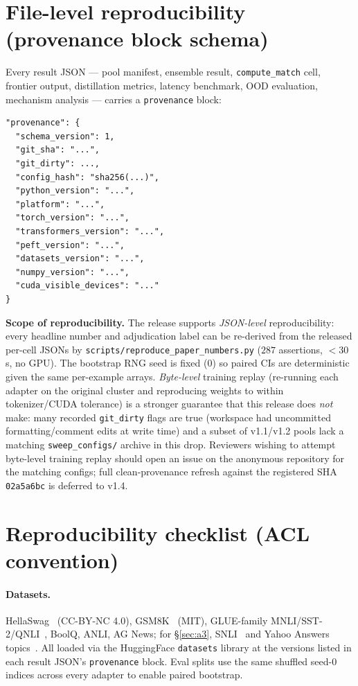 \documentclass[11pt]{article}
\begin{document}
\section{File-level reproducibility (provenance block schema)}\label{app:provenance}
Every result JSON --- pool manifest, ensemble result, \texttt{compute\_match} cell, frontier output, distillation metrics, latency benchmark, OOD evaluation, mechanism analysis --- carries a \texttt{provenance} block:
{\footnotesize
\begin{verbatim}
"provenance": {
  "schema_version": 1,
  "git_sha": "...",
  "git_dirty": ...,
  "config_hash": "sha256(...)",
  "python_version": "...",
  "platform": "...",
  "torch_version": "...",
  "transformers_version": "...",
  "peft_version": "...",
  "datasets_version": "...",
  "numpy_version": "...",
  "cuda_visible_devices": "..."
}
\end{verbatim}}
\textbf{Scope of reproducibility.} The release supports \emph{JSON-level} reproducibility: every headline number and adjudication label can be re-derived from the released per-cell JSONs by \texttt{scripts/\allowbreak reproduce\_\allowbreak paper\_\allowbreak numbers.\allowbreak py} ($287$ assertions, ${<}30$\,s, no GPU). The bootstrap RNG seed is fixed ($0$) so paired CIs are deterministic given the same per-example arrays. \emph{Byte-level} training replay (re-running each adapter on the original cluster and reproducing weights to within tokenizer/CUDA tolerance) is a stronger guarantee that this release does \emph{not} make: many recorded \texttt{git\_dirty} flags are true (workspace had uncommitted formatting/comment edits at write time) and a subset of v1.1/v1.2 pools lack a matching \texttt{sweep\_configs/} archive in this drop. Reviewers wishing to attempt byte-level training replay should open an issue on the anonymous repository for the matching configs; full clean-provenance refresh against the registered SHA \texttt{02a5a6bc} is deferred to v1.4.

\section{Reproducibility checklist (ACL convention)}\label{app:repro}
\paragraph{Datasets.} HellaSwag~\citep{zellers2019hellaswag} (CC-BY-NC 4.0), GSM8K~\citep{cobbe2021gsm8k} (MIT), GLUE-family MNLI/SST-2/QNLI~\citep{wang2018glue}, BoolQ, ANLI, AG News; for \S\ref{sec:a3}, SNLI~\citep{bowman2015snli} and Yahoo Answers topics~\citep{zhang2015character}. All loaded via the HuggingFace \texttt{datasets} library at the versions listed in each result JSON's \texttt{provenance} block. Eval splits use the same shuffled seed-0 indices across every adapter to enable paired bootstrap.
\end{document}
